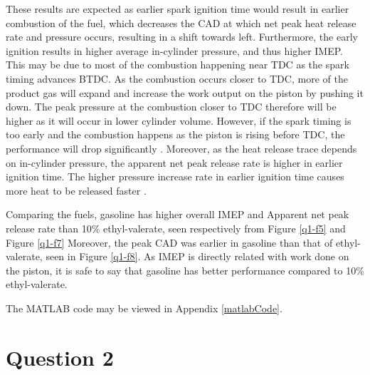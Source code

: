 These results are expected as earlier spark ignition time would result in earlier combustion of the fuel, which decreases the CAD at which net peak heat release rate and pressure occurs, resulting in a shift towards left. Furthermore, the early ignition results in higher average in-cylinder pressure, and thus higher IMEP. This may be due to most of the combustion happening near TDC as the spark timing advances BTDC. As the combustion occurs closer to TDC, more of the product gas will expand and increase the work output on the piston by pushing it down. The peak pressure at the combustion closer to TDC therefore will be higher as it will occur in lower cylinder volume. However, if the spark timing is too early and the combustion happens as the piston is rising before TDC, the performance will drop significantly \cite{q1-r1}. Moreover, as the heat release trace depends on in-cylinder pressure, the apparent net peak release rate is higher in earlier ignition time. The higher pressure increase rate in earlier ignition time causes more heat to be released faster \cite{q1-r2}.

Comparing the fuels, gasoline has higher overall IMEP and Apparent net peak release rate than 10\% ethyl-valerate, seen respectively from Figure \ref{q1-f5} and Figure \ref{q1-f7} Moreover, the peak CAD was earlier in gasoline than that of ethyl-valerate, seen in Figure \ref{q1-f8}. As IMEP is directly related with work done on the piston, it is safe to say that gasoline has better performance compared to 10\% ethyl-valerate.

The MATLAB code may be viewed in Appendix \ref{matlabCode}.
\section{Question 2}
